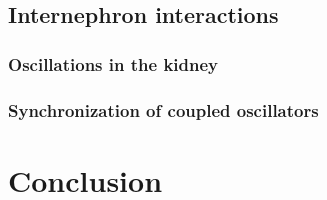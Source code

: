 	\subsection{Internephron interactions}
		\subsubsection{Oscillations in the kidney}
		\subsubsection{Synchronization of coupled oscillators}
	
		
		
			
 

\section{Conclusion}


\renewcommand{\bibname}{References}

